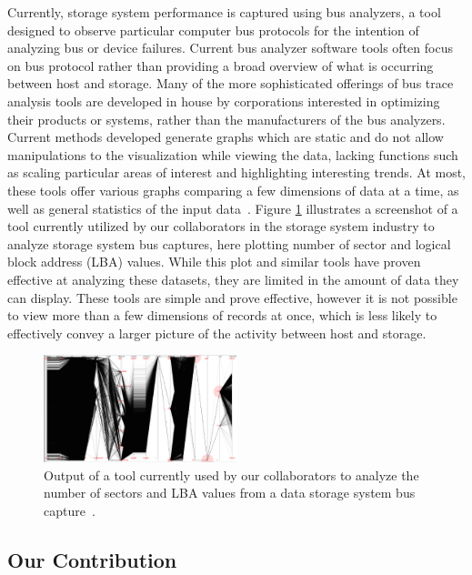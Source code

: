 \documentclass[journal]{vgtc}                %
\begin{document}
Currently, storage system performance is captured using bus analyzers, a tool designed to observe particular computer bus protocols for the intention of analyzing bus or device failures. Current bus analyzer software tools often focus on bus protocol rather than providing a broad overview of what is occurring between host and storage. Many of the more sophisticated offerings of bus trace analysis tools are developed in house by corporations interested in optimizing their products or systems, rather than the manufacturers of the bus analyzers. Current methods developed generate graphs which are static and do not allow manipulations to the visualization while viewing the data, lacking functions such as scaling particular areas of interest and highlighting interesting trends. At most, these tools offer various graphs comparing a few dimensions of data at a time, as well as general statistics of the input data~\cite{internal:understanding}. Figure \ref{fig:prev_tool2} illustrates a screenshot of a tool currently utilized by our collaborators in the storage system industry to analyze storage system bus captures, here plotting number of sector and logical block address (LBA) values. While this plot and similar tools have proven effective at analyzing these datasets, they are limited in the amount of data they can display. These tools are simple and prove effective, however it is not possible to view more than a few dimensions of records at once, which is less likely to effectively convey a larger picture of the activity between host and storage.

\begin{figure}[h!]
 \centering
 \includegraphics[width=0.5\textwidth]{images/prev_tool2.eps}
 \caption[Output of a tool currently used to analyze workload datasets.]{Output of a tool currently used by our collaborators to analyze the number of sectors and LBA values from a data storage system bus capture~\cite{internal:collab}.}
 \label{fig:prev_tool2}
\end{figure}

\subsection{Our Contribution}
\label{contribution}
\end{document}
